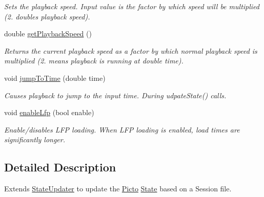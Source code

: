 \begin{DoxyCompactItemize}
\begin{DoxyCompactList}\small\item\em Sets the playback speed. Input value is the factor by which speed will be multiplied (2. doubles playback speed). \end{DoxyCompactList}\item 
\hypertarget{class_picto_1_1_playback_state_updater_afe7d1dbdaf982ace73af524477636881}{double \hyperlink{class_picto_1_1_playback_state_updater_afe7d1dbdaf982ace73af524477636881}{get\-Playback\-Speed} ()}\label{class_picto_1_1_playback_state_updater_afe7d1dbdaf982ace73af524477636881}

\begin{DoxyCompactList}\small\item\em Returns the current playback speed as a factor by which normal playback speed is multiplied (2. means playback is running at double time). \end{DoxyCompactList}\item 
\hypertarget{class_picto_1_1_playback_state_updater_ae5d0b66338a56810e71b596edbe0dd5b}{void \hyperlink{class_picto_1_1_playback_state_updater_ae5d0b66338a56810e71b596edbe0dd5b}{jump\-To\-Time} (double time)}\label{class_picto_1_1_playback_state_updater_ae5d0b66338a56810e71b596edbe0dd5b}

\begin{DoxyCompactList}\small\item\em Causes playback to jump to the input time. During udpate\-State() calls. \end{DoxyCompactList}\item 
\hypertarget{class_picto_1_1_playback_state_updater_ae2544385f15ca6b775bbd0cbb9289156}{void \hyperlink{class_picto_1_1_playback_state_updater_ae2544385f15ca6b775bbd0cbb9289156}{enable\-Lfp} (bool enable)}\label{class_picto_1_1_playback_state_updater_ae2544385f15ca6b775bbd0cbb9289156}

\begin{DoxyCompactList}\small\item\em Enable/disables L\-F\-P loading. When L\-F\-P loading is enabled, load times are significantly longer. \end{DoxyCompactList}\end{DoxyCompactItemize}


\subsection{Detailed Description}
Extends \hyperlink{class_picto_1_1_state_updater}{State\-Updater} to update the \hyperlink{namespace_picto}{Picto} \hyperlink{class_picto_1_1_state}{State} based on a Session file. 

